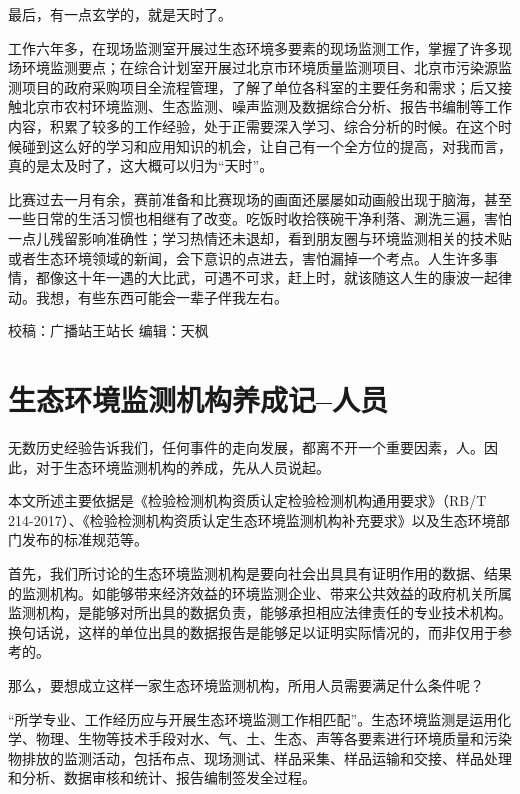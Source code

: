 \documentclass[]{book}
\begin{document}
最后，有一点玄学的，就是天时了。

工作六年多，在现场监测室开展过生态环境多要素的现场监测工作，掌握了许多现场环境监测要点；在综合计划室开展过北京市环境质量监测项目、北京市污染源监测项目的政府采购项目全流程管理，了解了单位各科室的主要任务和需求；后又接触北京市农村环境监测、生态监测、噪声监测及数据综合分析、报告书编制等工作内容，积累了较多的工作经验，处于正需要深入学习、综合分析的时候。在这个时候碰到这么好的学习和应用知识的机会，让自己有一个全方位的提高，对我而言，真的是太及时了，这大概可以归为``天时''。

比赛过去一月有余，赛前准备和比赛现场的画面还屡屡如动画般出现于脑海，甚至一些日常的生活习惯也相继有了改变。吃饭时收拾筷碗干净利落、涮洗三遍，害怕一点儿残留影响准确性；学习热情还未退却，看到朋友圈与环境监测相关的技术贴或者生态环境领域的新闻，会下意识的点进去，害怕漏掉一个考点。人生许多事情，都像这十年一遇的大比武，可遇不可求，赶上时，就该随这人生的康波一起律动。我想，有些东西可能会一辈子伴我左右。

校稿：广播站王站长
编辑：天枫

\hypertarget{ux751fux6001ux73afux5883ux76d1ux6d4bux673aux6784ux517bux6210ux8bb0ux4ebaux5458}{%
\section{生态环境监测机构养成记--人员}\label{ux751fux6001ux73afux5883ux76d1ux6d4bux673aux6784ux517bux6210ux8bb0ux4ebaux5458}}

无数历史经验告诉我们，任何事件的走向发展，都离不开一个重要因素，人。因此，对于生态环境监测机构的养成，先从人员说起。

本文所述主要依据是《检验检测机构资质认定检验检测机构通用要求》（RB/T 214-2017）、《检验检测机构资质认定生态环境监测机构补充要求》以及生态环境部门发布的标准规范等。

首先，我们所讨论的生态环境监测机构是要向社会出具具有证明作用的数据、结果的监测机构。如能够带来经济效益的环境监测企业、带来公共效益的政府机关所属监测机构，是能够对所出具的数据负责，能够承担相应法律责任的专业技术机构。换句话说，这样的单位出具的数据报告是能够足以证明实际情况的，而非仅用于参考的。

那么，要想成立这样一家生态环境监测机构，所用人员需要满足什么条件呢？

``所学专业、工作经历应与开展生态环境监测工作相匹配''。生态环境监测是运用化学、物理、生物等技术手段对水、气、土、生态、声等各要素进行环境质量和污染物排放的监测活动，包括布点、现场测试、样品采集、样品运输和交接、样品处理和分析、数据审核和统计、报告编制签发全过程。
\end{document}
